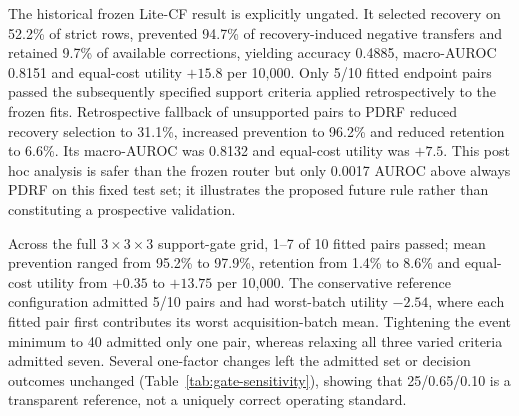 \documentclass[11pt]{article}
\begin{document}
The historical frozen Lite-CF result is explicitly ungated. It selected recovery on 52.2\% of strict rows, prevented 94.7\% of recovery-induced negative transfers and retained 9.7\% of available corrections, yielding accuracy 0.4885, macro-AUROC 0.8151 and equal-cost utility $+15.8$ per 10,000. Only 5/10 fitted endpoint pairs passed the subsequently specified support criteria applied retrospectively to the frozen fits. Retrospective fallback of unsupported pairs to PDRF reduced recovery selection to 31.1\%, increased prevention to 96.2\% and reduced retention to 6.6\%. Its macro-AUROC was 0.8132 and equal-cost utility was $+7.5$. This post hoc analysis is safer than the frozen router but only 0.0017 AUROC above always PDRF on this fixed test set; it illustrates the proposed future rule rather than constituting a prospective validation.

\begin{table}[ht]
\centering
\caption{\textbf{Strict-subset endpoints and calibration-frozen policies.} Values are means over 40 fixed mechanism--fitted-pair cells. Prevention and retention have different opportunity denominators. $U_1/10^4$ is incremental routing utility relative to PDRF with equal correction and harm values and no compute penalty. The support-gated row is a post hoc gate applied retrospectively to frozen fits; the 94.7\%/9.7\% row is the ungated frozen result. The two-stage 1:1 row is included for completeness but remains an analytical control.}
\label{tab:lite-main}
\resizebox{\textwidth}{!}{}
\end{table}

Across the full $3\times3\times3$ support-gate grid, 1--7 of 10 fitted pairs passed; mean prevention ranged from 95.2\% to 97.9\%, retention from 1.4\% to 8.6\% and equal-cost utility from $+0.35$ to $+13.75$ per 10,000. The conservative reference configuration admitted 5/10 pairs and had worst-batch utility $-2.54$, where each fitted pair first contributes its worst acquisition-batch mean. Tightening the event minimum to 40 admitted only one pair, whereas relaxing all three varied criteria admitted seven. Several one-factor changes left the admitted set or decision outcomes unchanged (Table~\ref{tab:gate-sensitivity}), showing that 25/0.65/0.10 is a transparent reference, not a uniquely correct operating standard.

\begin{table}[ht]
\centering
\caption{\textbf{One-factor sensitivity of the post hoc deployment-support gate.} The reference row (bold passed count) requires 25 events per preference class, median repeated AUROC 0.65 and threshold range at most 0.10. Every-fold class support and minimum repeat AUROC 0.60 remain fixed. Worst-batch utility averages each fitted pair's least favourable acquisition-batch mean. The complete 27-configuration grid is provided in the Supplementary Information.}
\label{tab:gate-sensitivity}
\scriptsize
\resizebox{\textwidth}{!}{}
\end{table}
\end{document}
